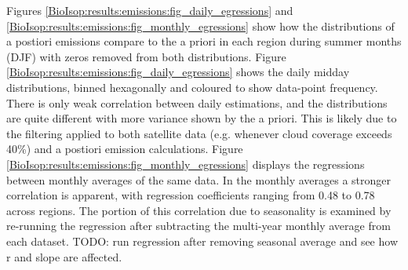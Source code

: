     Figures \ref{BioIsop:results:emissions:fig_daily_egressions} and \ref{BioIsop:results:emissions:fig_monthly_egressions} show how the distributions of a postiori emissions compare to the a priori in each region during summer months (DJF) with zeros removed from both distributions. %
    Figure \ref{BioIsop:results:emissions:fig_daily_egressions} shows the daily midday distributions, binned hexagonally and coloured to show data-point frequency.
    There is only weak correlation between daily estimations, and the distributions are quite different with more variance shown by the a priori.
    This is likely due to the filtering applied to both satellite data (e.g. whenever cloud coverage exceeds 40\%) and a postiori emission calculations.
    Figure \ref{BioIsop:results:emissions:fig_monthly_egressions} displays the regressions between monthly averages of the same data. 
    In the monthly averages a stronger correlation is apparent, with regression coefficients ranging from 0.48 to 0.78 across regions.
    The portion of this correlation due to seasonality is examined by re-running the regression after subtracting the multi-year monthly average from each dataset.
    TODO: run regression after removing seasonal average and see how r and slope are affected.
    
    
    

